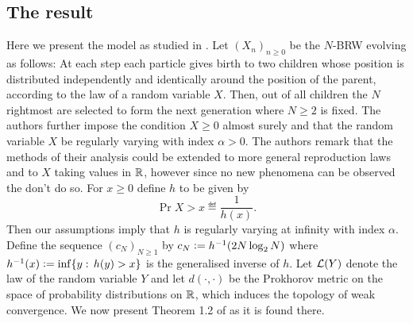 \subsection{The result}\label{sec:poly_result}
Here we present the model as studied in \cite{poly_tails}. Let $(X_n)_{n \geq 0}$ be the $N$-BRW evolving as follows: At each step each particle gives birth to two children whose position is distributed independently and identically around the position of the parent, according to the law of a random variable $X$. Then, out of all children the $N$ rightmost are selected to form the next generation where $N \geq 2$ is fixed. The authors further impose the condition $X \geq 0$ almost surely and that the random variable $X$ be regularly varying with index $\alpha > 0$. The authors remark that the methods of their analysis could be extended to more general reproduction laws and to $X$ taking values in $\R$, however since no new phenomena can be observed the don't do so. For $x \geq 0$ define $h$ to be given by
\begin{equation}\nonumber
\Pr{X > x} \eqdef \frac{1}{h(x)}. 
\end{equation} 
Then our assumptions imply that $h$ is regularly varying at infinity with index $\alpha$. Define the sequence $(c_N)_{N \geq 1}$ by $c_N \defeq h^{-1} (2N \log_2 N)$ where $h^{-1}(x) \defeq \inf\{ y :\, h(y) > x\}$ is the generalised inverse of $h$. Let $\cal{L}(Y)$ denote the law of the random variable $Y$ and let $d(\cdot, \cdot)$ be the Prokhorov metric on the space of probability distributions on $\R$, which induces the topology of weak convergence. We now present Theorem 1.2 of \cite{poly_tails} as it is found there. 

